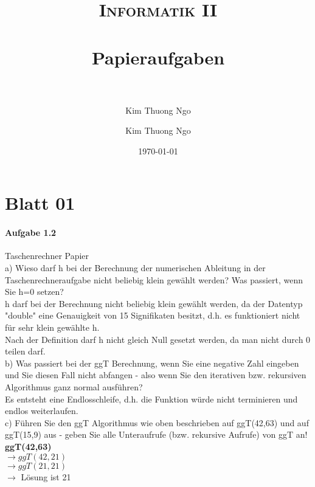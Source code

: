 \documentclass[paper=a4, fontsize=11pt]{scrartcl}
\author{Kim Thuong Ngo}
\title{	
\normalfont \normalsize 
\textsc{Informatik II} \\ [25pt] 
\horrule{0.5pt} \\[0.4cm] 
\huge Papieraufgaben \\ 
\horrule{2pt} \\[0.5cm] 
}
\author{Kim Thuong Ngo}
\date{\normalsize\today}
\numberwithin{equation}{section}
\numberwithin{figure}{section}
\numberwithin{table}{section}
\begin{document}
\maketitle 

\newpage

\tableofcontents

\newpage


\section{Blatt 01}

\paragraph{Aufgabe 1.2} Taschenrechner Papier \\

a) Wieso darf h bei der Berechnung der numerischen Ableitung in der Taschenrechneraufgabe nicht beliebig klein gewählt werden? Was passiert, wenn Sie h=0 setzen? \\

h darf bei der Berechnung nicht beliebig klein gewählt werden, da der Datentyp "double" eine Genauigkeit von 15 Signifikaten besitzt, d.h. es funktioniert nicht für sehr klein gewählte h. \\
Nach der Definition darf h nicht gleich Null gesetzt werden, da man nicht durch 0 teilen darf. \\

b) Was passiert bei der ggT Berechnung, wenn Sie eine negative Zahl eingeben und Sie diesen Fall nicht abfangen -  also wenn Sie den iterativen bzw. rekursiven Algorithmus ganz normal ausführen? \\

Es entsteht eine Endlosschleife, d.h. die Funktion würde nicht terminieren und endlos weiterlaufen. \\

c) Führen Sie den ggT Algorithmus wie oben beschrieben auf ggT(42,63) und auf ggT(15,9) aus - geben Sie alle Unteraufrufe (bzw. rekursive Aufrufe) von ggT an! \\


\textbf{ggT(42,63)}\\
$\longrightarrow ggT(42,21)$\\
$\longrightarrow ggT(21,21)$\\
$\longrightarrow$ Lösung ist 21\\
\end{document}
